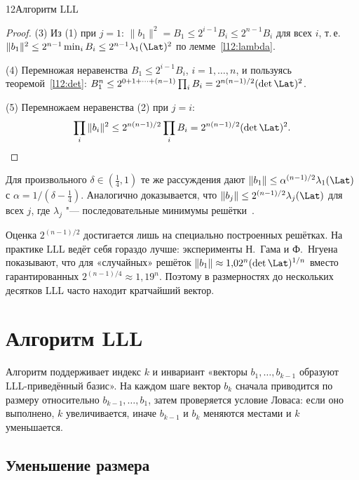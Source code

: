 \begin{lecture}{12}{Алгоритм LLL}
\begin{proof}
(3) Из (1) при $j = 1$: $\|b_1\|^2 = B_1 \le 2^{i-1} B_i \le 2^{n-1} B_i$ для всех $i$,
т.\,е. $\|b_1\|^2 \le 2^{n-1} \min_i B_i \le 2^{n-1} \lambda_1(\Lat)^2$ по
лемме~\ref{l12:lambda}.

(4) Перемножая неравенства $B_1 \le 2^{i-1} B_i$, $i = 1, \dots, n$, и пользуясь
теоремой~\ref{l12:det}:
$B_1^n \le 2^{0 + 1 + \cdots + (n-1)} \prod_i B_i = 2^{n(n-1)/2} (\det\Lat)^2$.

(5) Перемножаем неравенства (2) при $j = i$:
\[\prod_i \|b_i\|^2 \le 2^{n(n-1)/2} \prod_i B_i = 2^{n(n-1)/2} (\det \Lat)^2.\]
\end{proof}

\begin{remark}
Для произвольного $\delta \in (\frac14, 1)$ те же рассуждения дают
$\|b_1\| \le \alpha^{(n-1)/2} \lambda_1(\Lat)$ с $\alpha = 1/(\delta - \frac14)$. Аналогично
доказывается, что $\|b_j\| \le 2^{(n-1)/2} \lambda_j(\Lat)$ для всех $j$, где
$\lambda_j$ "--- последовательные минимумы решётки~\cite{lll}.
\end{remark}

Оценка $2^{(n-1)/2}$ достигается лишь на специально построенных решётках. На практике
LLL ведёт себя гораздо лучше: эксперименты Н.~Гама и Ф.~Нгуена~\cite{gama-nguyen} показывают,
что для «случайных» решёток $\|b_1\| \approx 1{,}02^n (\det\Lat)^{1/n}$ вместо гарантированных
$2^{(n-1)/4} \approx 1{,}19^{n}$. Поэтому в размерностях до нескольких десятков LLL часто
находит кратчайший вектор.


\section{Алгоритм LLL}

Алгоритм поддерживает индекс $k$ и инвариант «векторы $b_1, \dots, b_{k-1}$ образуют
LLL-приведённый базис». На каждом шаге вектор $b_k$ сначала приводится по размеру
относительно $b_{k-1}, \dots, b_1$, затем проверяется условие Ловаса: если оно выполнено,
$k$ увеличивается, иначе $b_{k-1}$ и $b_k$ меняются местами и $k$ уменьшается.

\subsection{Уменьшение размера}


\end{lecture}

